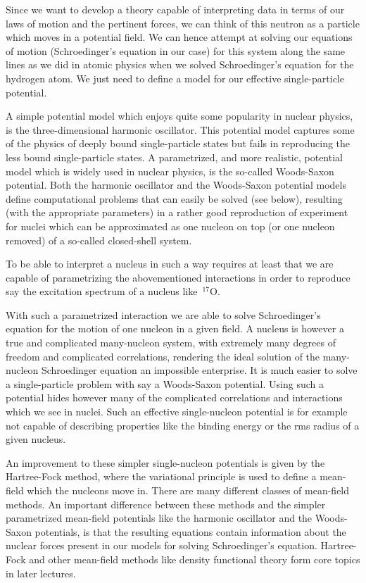 \documentclass[%
twoside,                 %
final,                   %
10pt]{article}
\begin{document}
Since we want to develop a theory capable of interpreting data in terms of our laws of motion and the pertinent forces,
we can think of this neutron as a particle which moves in a potential field. We can hence attempt at solving our equations of motion (Schroedinger's equation in our case) for this system along the same lines as we did in atomic physics when we solved Schroedinger's equation for the hydrogen atom. We just need to define a model for our effective single-particle potential. 

A simple potential model which enjoys quite some popularity in nuclear physics, is the three-dimensional harmonic oscillator. This potential model captures some of the physics of deeply bound single-particle states but fails in reproducing 
the less bound single-particle states. A parametrized, and more realistic,  potential model which is widely used in nuclear physics, is the so-called Woods-Saxon potential. Both the harmonic oscillator and the Woods-Saxon potential models define computational problems that can easily be solved (see below), resulting (with the appropriate parameters) in a rather good reproduction of experiment for nuclei which can be approximated as one nucleon on top (or one nucleon removed) of a so-called closed-shell system.



To be able to interpret a nucleus in such  a way requires at least that we are capable of parametrizing the abovementioned
interactions in order to reproduce say the excitation spectrum of a nucleus like $\,{}^{17}\mbox{O}$. 

With such a parametrized interaction we are able to solve Schroedinger's equation for the motion of one nucleon in a given field. A nucleus is however a true and complicated many-nucleon system, with extremely many degrees of freedom and complicated correlations, rendering the ideal solution of the many-nucleon Schroedinger equation an impossible enterprise. It is much easier to solve a single-particle problem with say a Woods-Saxon potential. Using such a potential hides however many of the complicated correlations and interactions which we see in nuclei. Such an effective single-nucleon potential is for example not capable of 
describing properties like the binding energy or the rms radius of a given nucleus. 

An improvement to these simpler single-nucleon potentials is given by the Hartree-Fock method, where the variational principle is used to define a mean-field which the nucleons move in. There are many different classes of mean-field methods.
An important difference between these methods and the simpler parametrized mean-field potentials like the harmonic oscillator and the Woods-Saxon potentials, is that the resulting equations contain information about the nuclear forces present in our models for solving Schroedinger's equation. Hartree-Fock and other mean-field methods like density functional theory form core topics in later lectures.
\end{document}
